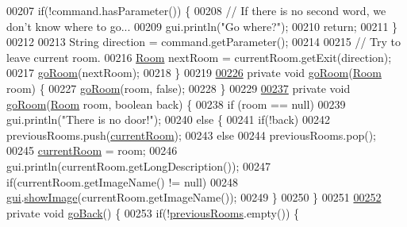 \begin{DoxyCode}
{00207         \textcolor{keywordflow}{if}(!command.hasParameter()) \{
00208             \textcolor{comment}{// If there is no second word, we don't know where to go...}
00209             gui.println(\textcolor{stringliteral}{"Go where?"});
00210             \textcolor{keywordflow}{return};
00211         \}
00212 
00213         String direction = command.getParameter();
00214 
00215         \textcolor{comment}{// Try to leave current room.}
00216         \hyperlink{classRoom}{Room} nextRoom = currentRoom.getExit(direction);
00217         \hyperlink{classGameEngine_a2ec577574f345764435837fc0204b2e0}{goRoom}(nextRoom);
00218     \}
00219 
\hypertarget{GameEngine_8java_source_l00226}{}\hyperlink{classGameEngine_a09acb51b95ec98aed78d928f91e61a3d}{00226}     \textcolor{keyword}{private} \textcolor{keywordtype}{void} \hyperlink{classGameEngine_a09acb51b95ec98aed78d928f91e61a3d}{goRoom}(\hyperlink{classRoom}{Room} room) \{
00227         \hyperlink{classGameEngine_a2ec577574f345764435837fc0204b2e0}{goRoom}(room, \textcolor{keyword}{false});
00228     \}
00229 
\hypertarget{GameEngine_8java_source_l00237}{}\hyperlink{classGameEngine_ae847246e53c53b84787eec490aedf9ad}{00237}     \textcolor{keyword}{private} \textcolor{keywordtype}{void} \hyperlink{classGameEngine_ae847246e53c53b84787eec490aedf9ad}{goRoom}(\hyperlink{classRoom}{Room} room, \textcolor{keywordtype}{boolean} back) \{
00238         \textcolor{keywordflow}{if} (room == null)
00239             gui.println(\textcolor{stringliteral}{"There is no door!"});
00240         \textcolor{keywordflow}{else} \{
00241             \textcolor{keywordflow}{if}(!back)
00242                 previousRooms.push(\hyperlink{classGameEngine_aa08e7cbb458047a2f72ff594d2e230bc}{currentRoom});
00243             \textcolor{keywordflow}{else}
00244                 previousRooms.pop();
00245             \hyperlink{classGameEngine_aa08e7cbb458047a2f72ff594d2e230bc}{currentRoom} = room;
00246             gui.println(currentRoom.getLongDescription());
00247             \textcolor{keywordflow}{if}(currentRoom.getImageName() != null)
00248                 \hyperlink{classGameEngine_a2a7d0bb6183b3f3ef3ee2008926374a0}{gui}.\hyperlink{classUserInterface_ab793a0f12878c698ba3e1720a9f86f3b}{showImage}(currentRoom.getImageName());
00249         \}
00250     \}
00251 
\hypertarget{GameEngine_8java_source_l00252}{}\hyperlink{classGameEngine_ac22dcdb540cb27f39597ee4f03ad167a}{00252}     \textcolor{keyword}{private} \textcolor{keywordtype}{void} \hyperlink{classGameEngine_ac22dcdb540cb27f39597ee4f03ad167a}{goBack}() \{   
00253         \textcolor{keywordflow}{if}(!\hyperlink{classGameEngine_a46c905c0610d22223520a8db0e519ec1}{previousRooms}.empty()) \{
}
\end{DoxyCode}
